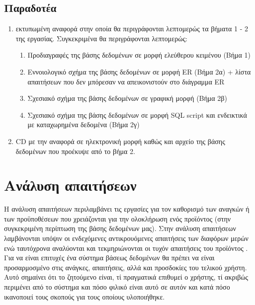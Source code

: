 \documentclass{assignment}
\begin{document}
\subsection{Παραδοτέα}

\begin{enumerate}

  \item εκτυπωμένη αναφορά στην οποία θα περιγράφονται λεπτομερώς τα βήματα 1 - 2 της εργασίας. Συγκεκριμένα θα περιγράφονται λεπτομερώς:

  \begin{enumerate}[i]
    \item Προδιαγραφές της βάσης δεδομένων σε μορφή ελεύθερου κειμένου (Βήμα 1)
    \item Εννοιολογικό σχήμα της βάσης δεδομένων σε μορφή ER (Βήμα 2α) + λίστα απαιτήσεων που δεν μπόρεσαν να απεικονιστούν στο διάγραμμα ER
    \item Σχεσιακό σχήμα της βάσης δεδομένων σε γραφική μορφή (Βήμα 2β)
    \item Σχεσιακό σχήμα της βάσης δεδομένων σε μορφή SQL script και ενδεικτικά  με καταχωρημένα δεδομένα (Βήμα 2γ)
  \end{enumerate}

  \item CD με την αναφορά σε ηλεκτρονική μορφή καθώς και αρχείο  της βάσης δεδομένων που προέκυψε από το βήμα 2.

\end{enumerate}

\section{Ανάλυση απαιτήσεων}

Η ανάλυση απαιτήσεων περιλαμβάνει τις εργασίες για τον καθορισμό των αναγκών ή των προϋποθέσεων που χρειάζονται για την ολοκλήρωση ενός προϊόντος (στην συγκεκριμένη περίπτωση της βάσης δεδομένων μας). Στην ανάλυση απαιτήσεων λαμβάνονται υπόψιν οι ενδεχόμενες αντικρουόμενες απαιτήσεις των διαφόρων μερών ενώ ταυτόχρονα αναλύονται και τεκμηριώνονται οι τυχόν απαιτήσεις του προϊόντος \cite{wiki:requirement_analysis}. Για να είναι επιτυχές ένα σύστημα βάσεως δεδομένων θα πρέπει να είναι προσαρμοσμένο στις ανάγκες, απαιτήσεις, αλλά και προσδοκίες του τελικού χρήστη. Αυτό σημαίνει ότι το ζητούμενο είναι, τί πραγματικά επιθυμεί ο χρήστης, τί ακριβώς περιμένει από το σύστημα και πόσο φιλικό είναι αυτό σε αυτόν και κατά πόσο ικανοποιεί τους σκοπούς για τους οποίους υλοποιήθηκε.
\end{document}
